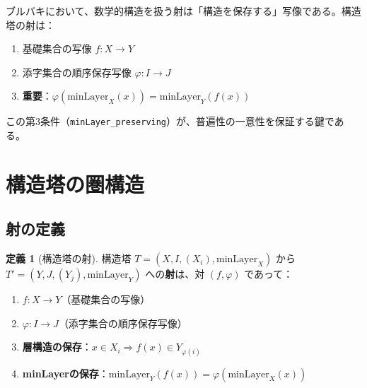 \documentclass[a4paper,12pt]{ltjsarticle}
\theoremstyle{definition}
\newtheorem{definition}[theorem]{定義}
\begin{document}
\begin{bourbaki}
ブルバキにおいて、数学的構造を扱う射は「構造を保存する」写像である。構造塔の射は：
\begin{enumerate}
\item 基礎集合の写像 $f : X \to Y$
\item 添字集合の順序保存写像 $\varphi : I \to J$
\item \textbf{重要}：$\varphi(\mathrm{minLayer}_X(x)) = \mathrm{minLayer}_Y(f(x))$
\end{enumerate}
この第3条件（\texttt{minLayer\_preserving}）が、普遍性の一意性を保証する鍵である。
\end{bourbaki}

\section{構造塔の圏構造}

\subsection{射の定義}

\begin{definition}[構造塔の射]\label{def:hom}
構造塔 $T = (X, I, (X_i), \mathrm{minLayer}_X)$ から $T' = (Y, J, (Y_j), \mathrm{minLayer}_Y)$ への\textbf{射}は、対 $(f, \varphi)$ であって：

\begin{enumerate}
\item $f : X \to Y$（基礎集合の写像）
\item $\varphi : I \to J$（添字集合の順序保存写像）
\item \textbf{層構造の保存}：$x \in X_i \Rightarrow f(x) \in Y_{\varphi(i)}$
\item \textbf{minLayerの保存}：$\mathrm{minLayer}_Y(f(x)) = \varphi(\mathrm{minLayer}_X(x))$
\end{enumerate}
\end{definition}
\end{document}
